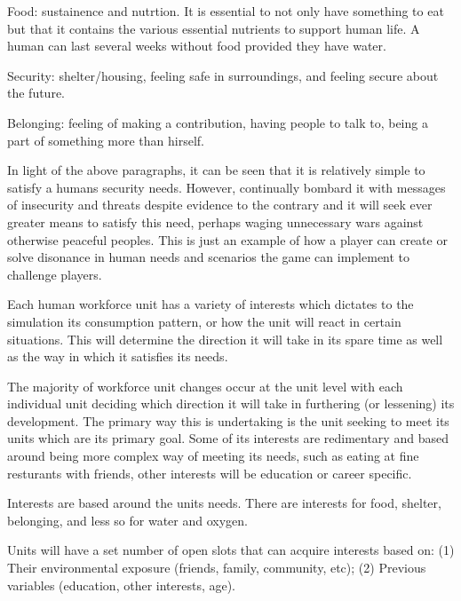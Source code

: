 Food: sustainence and nutrtion. It is essential to not only have something to eat but that it contains the various essential nutrients to support human life. A human can last several weeks without food provided they have water.

Security: shelter/housing, feeling safe in surroundings, and feeling secure about the future.

Belonging: feeling of making a contribution, having people to talk to, being a part of something more than hirself.

In light of the above paragraphs, it can be seen that it is relatively simple to satisfy a humans security needs. However, continually bombard it with messages of insecurity and threats despite evidence to the contrary and it will seek ever greater means to satisfy this need, perhaps waging unnecessary wars against otherwise peaceful peoples. This is just an example of how a player can create or solve disonance in human needs and scenarios the game can implement to challenge players.

Each human workforce unit has a variety of interests which dictates to the simulation its consumption pattern, or how the unit will react in certain situations. This will determine the direction it will take in its spare time as well as the way in which it satisfies its needs. 

The majority of workforce unit changes occur at the unit level with each individual unit deciding which direction it will take in furthering (or lessening) its development. The primary way this is undertaking is the unit seeking to meet its units which are its primary goal. Some of its interests are redimentary and based around being more complex way of meeting its needs, such as eating at fine resturants with friends, other interests will be education or career specific. 

Interests are based around the units needs. There are interests for food, shelter, belonging, and less so for water and oxygen.

Units will have a set number of open slots that can acquire interests based on: (1) Their environmental exposure (friends, family, community, etc); (2) Previous variables (education, other interests, age).



